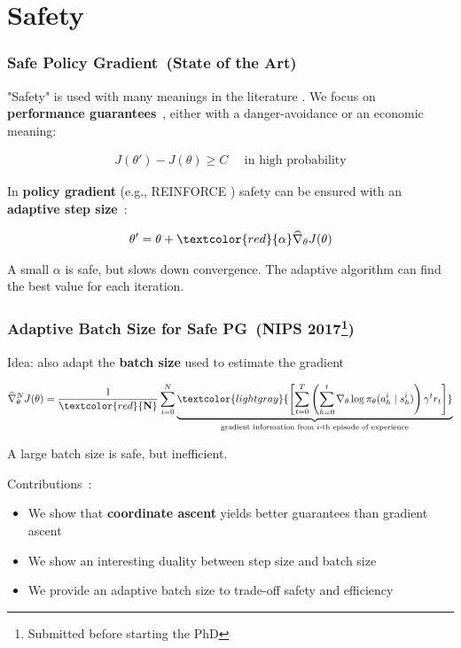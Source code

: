 \documentclass{beamer}
\begin{document}
\section{Safety}


\begin{frame}
\frametitle{Safe Policy Gradient~\small(State of the Art)}
"Safety" is used with many meanings in the literature \cite{garcia2015comprehensive}. We focus on \textbf{performance guarantees}~\cite{kakade2002approximately, thomas2015high}, either with a danger-avoidance or an economic meaning:

\begin{align*}
	J(\theta') - J(\theta) \geq C \quad\text{ in high probability}
\end{align*}

In \textbf{policy gradient} (e.g., REINFORCE \cite{williams1992simple}) safety can be ensured with an \textbf{adaptive step size}~\cite{pirotta2013adaptive}:

\begin{align*}
	\theta' = \theta + \textcolor{red}{\mathbf{\alpha}}\widehat{\nabla}_{\theta}J(\theta)
\end{align*}

A small $\alpha$ is safe, but slows down convergence. The adaptive algorithm can find the best value for each iteration. 

\end{frame}


\begin{frame}
\frametitle{Adaptive Batch Size for Safe PG~\small(NIPS 2017\footnote{Submitted before starting the PhD})}
Idea: also adapt the \textbf{batch size} used to estimate the gradient

\begin{align*}
	\widehat{\nabla}_{\theta}^NJ(\theta) = \frac{1}{\textcolor{red}{\mathbf{N}}}\sum_{i=0}^{N}\underbrace{\textcolor{lightgray}{\left[\sum_{t=0}^T\left(\sum_{h=0}^t\nabla_{\theta}\log\pi_{\theta}(a_h^i\mid s_h^i)\right) \gamma^tr_t\right]}}_{\text{gradient information from $i$-th episode of experience}}
\end{align*}

A large batch size is safe, but inefficient.

\vfill

\colorbox{cyan!10}{
\begin{minipage}{\textwidth}
Contributions~\cite{papini2017adaptive}:
\begin{itemize}
	\item We show that \textbf{coordinate ascent} yields better guarantees than gradient ascent
	\item We show an interesting duality between step size and batch size
	\item We provide an adaptive batch size to trade-off safety and efficiency
\end{itemize}
\end{minipage}
}
\end{frame}
\end{document}
